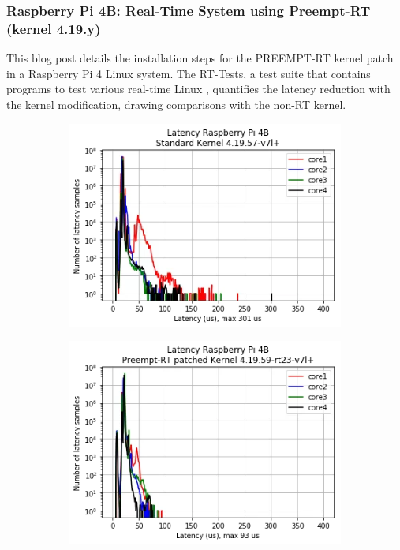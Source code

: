 \subsubsection{Raspberry Pi 4B: Real-Time System using Preempt-RT (kernel 4.19.y) \cite{maurorivaRaspberryPi4B2019}}
This blog post details the installation steps for the PREEMPT-RT kernel patch in a Raspberry Pi 4 Linux system. The RT-Tests, a test suite that contains programs to test various real-time Linux \cite{costashulRTTests2023}, quantifies the latency reduction with the kernel modification, drawing comparisons with the non-RT kernel.

\begin{figure}[h]
    \centering
    \begin{subfigure}{.49\textwidth}
        \centering
        \includegraphics[width=1\linewidth]{assets/lemariva-std-kernel-latency.png}
        \caption{}
    \end{subfigure}
    \hfill
    \begin{subfigure}{.49\textwidth}
        \centering
        \includegraphics[width=1\linewidth]{assets/lemariva-rt-kernel-latency.png}

\end{subfigure}
\end{figure}
